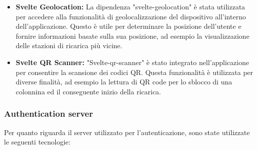\begin{itemize}
      \item \textbf{Svelte Geolocation:} La dipendenza "svelte-geolocation" è stata utilizzata per accedere alla funzionalità di geolocalizzazione del dispositivo all'interno dell'applicazione. Questo è utile per determinare la posizione dell'utente e fornire informazioni basate sulla sua posizione, ad esempio la visualizzazione delle stazioni di ricarica più vicine.

      \item \textbf{Svelte QR Scanner:} "Svelte-qr-scanner" è stato integrato nell'applicazione per consentire la scansione dei codici QR. Questa funzionalità è utilizzata per diverse finalità, ad esempio la lettura di QR code per lo sblocco di una colonnina ed il conseguente inizio della ricarica.
\end{itemize}

\subsubsection{Authentication server}

Per quanto riguarda il server utilizzato per l'autenticazione, sono state utilizzate le seguenti tecnologie:

